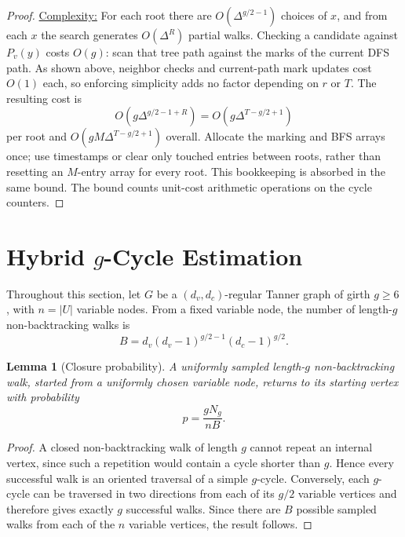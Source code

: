 \documentclass[conference]{IEEEtran}
\newtheorem{lemma}{Lemma}
\begin{document}
\begin{proof}
\underline{Complexity:}
For each root there are $O(\Delta^{g/2-1})$ choices of $x$, and from each
$x$ the search generates $O(\Delta^R)$ partial walks. Checking a candidate
against $P_v(y)$ costs $O(g)$: scan that tree path against the marks of
the current DFS path. As shown above, neighbor checks and current-path mark updates cost
$O(1)$ each, so enforcing simplicity adds no factor depending on $r$ or $T$.
The resulting cost is
\[
O\!\left(g\Delta^{g/2-1+R}\right)
=
O\!\left(g\Delta^{T-g/2+1}\right)
\]
per root and
$O\!\left(gM\Delta^{T-g/2+1}\right)$ overall.
Allocate the marking and BFS arrays once; use timestamps or clear only
touched entries between roots, rather than resetting an $M$-entry array
for every root. This bookkeeping is absorbed in the same bound. The bound
counts unit-cost arithmetic operations on the cycle counters.
\end{proof}

\section{Hybrid $g$-Cycle Estimation}
\label{sec:random}
Throughout this section, let $G$ be a $(d_v,d_c)$-regular Tanner graph
of girth $g\ge6$, with $n=|U|$ variable nodes.
From a fixed variable node, the number of length-$g$ non-backtracking walks
is
\begin{equation}\label{eq:B}
 B=d_v(d_v-1)^{g/2-1}(d_c-1)^{g/2}.
\end{equation}

\begin{lemma}[Closure probability]\label{lem:closure}
A uniformly sampled length-$g$ non-backtracking walk, started from a
uniformly chosen variable node, returns to its starting vertex with
probability
\begin{equation}\label{eq:p}
 p=\frac{gN_g}{nB}.
\end{equation}
\end{lemma}

\begin{proof}
A closed non-backtracking walk of length $g$ cannot repeat an internal
vertex, since such a repetition would contain a cycle shorter than $g$.
Hence every successful walk is an oriented traversal of a simple
$g$-cycle. Conversely, each $g$-cycle can be traversed in two directions
from each of its $g/2$ variable vertices and therefore gives exactly $g$
successful walks. Since there are $B$ possible sampled walks from each of the $n$ variable vertices, the result
follows.
\end{proof}
\end{document}

